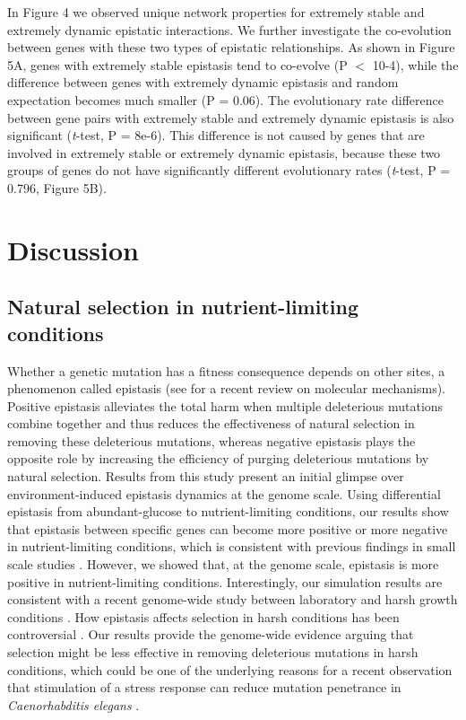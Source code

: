 In Figure 4 we observed unique network properties for extremely stable
and extremely dynamic epistatic interactions. We further investigate
the co-evolution between genes with these two types of epistatic
relationships. As shown in Figure 5A, genes with extremely stable
epistasis tend to co-evolve (P $<$ 10-4), while the difference between
genes with extremely dynamic epistasis and random expectation becomes
much smaller (P = 0.06). The evolutionary rate difference between gene
pairs with extremely stable and extremely dynamic epistasis is also
significant (\textit{t}-test, P = 8e-6). This difference is not caused by
genes that are involved in extremely stable or extremely dynamic
epistasis, because these two groups of genes do not have significantly
different evolutionary rates (\textit{t}-test, P = 0.796, Figure 5B).

\section{Discussion}

\subsection{Natural selection in nutrient-limiting conditions}

Whether a genetic mutation has a fitness consequence depends on other
sites, a phenomenon called epistasis (see \citealt{Lehner2011} for a
recent review on
molecular mechanisms). Positive epistasis alleviates the total harm
when multiple deleterious mutations combine together and thus reduces
the effectiveness of natural selection in removing these deleterious
mutations, whereas negative epistasis plays the opposite role by
increasing the efficiency of purging deleterious mutations by natural
selection. Results from this study present an initial glimpse over
environment-induced epistasis dynamics at the genome scale. Using
differential epistasis from abundant-glucose to nutrient-limiting
conditions, our results show that epistasis between specific genes can
become more positive or more negative in nutrient-limiting conditions,
which is consistent with previous findings in small scale studies
\citep{Remold2001, Kishony2003, Cooper2005, Korona1999, Szafraniec2001,
Jasnos2008, Vassilieva2000, Baer2006, Yang2001, Fry2002,
AletheaD.Wang2009, Young2009}. However, we showed that, at the genome
scale, epistasis is
more positive in nutrient-limiting conditions. Interestingly, our
simulation results are consistent with a recent genome-wide study
between laboratory and harsh growth conditions
\citep{Bandyopadhyay2011}. How epistasis affects selection in harsh
conditions has been controversial \citep{Agrawal2010}. Our
results provide the genome-wide evidence arguing that selection might
be less effective in removing deleterious mutations in harsh
conditions, which could be one of the underlying reasons for a recent
observation that stimulation of a stress response can reduce mutation
penetrance in \textit{Caenorhabditis elegans} \citep{Casanueva2012}.

